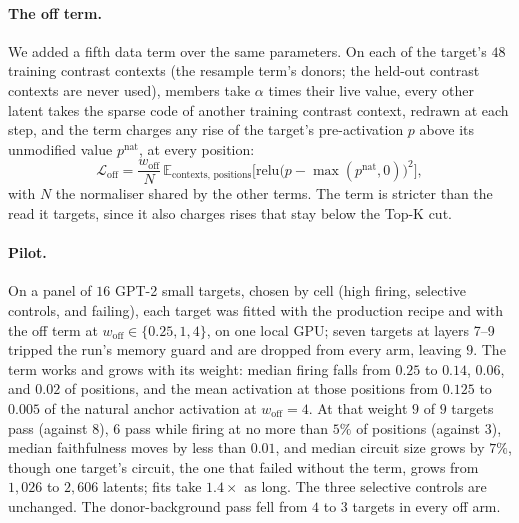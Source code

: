 \documentclass[10pt]{article}
\begin{document}
\paragraph{The off term.}
We added a fifth data term over the same parameters.
On each of the target's $48$ training contrast contexts (the resample term's donors; the held-out contrast contexts are never used), members take $\alpha$ times their live value, every other latent takes the sparse code of another training contrast context, redrawn at each step, and the term charges any rise of the target's pre-activation $p$ above its unmodified value $p^{\mathrm{nat}}$, at every position:
\[
\mathcal{L}_{\mathrm{off}} = \frac{w_{\mathrm{off}}}{N}\, \mathbb{E}_{\text{contexts, positions}} \Big[\mathrm{relu}\big(p - \max(p^{\mathrm{nat}}, 0)\big)^{2}\Big],
\]
with $N$ the normaliser shared by the other terms.
The term is stricter than the read it targets, since it also charges rises that stay below the Top-K cut.

\paragraph{Pilot.}
On a panel of $16$ GPT-2 small targets, chosen by cell (high firing, selective controls, and failing), each target was fitted with the production recipe and with the off term at $w_{\mathrm{off}} \in \{0.25, 1, 4\}$, on one local GPU; seven targets at layers 7--9 tripped the run's memory guard and are dropped from every arm, leaving $9$.
The term works and grows with its weight: median firing falls from $0.25$ to $0.14$, $0.06$, and $0.02$ of positions, and the mean activation at those positions from $0.125$ to $0.005$ of the natural anchor activation at $w_{\mathrm{off}} = 4$.
At that weight $9$ of $9$ targets pass (against $8$), $6$ pass while firing at no more than $5\%$ of positions (against $3$), median faithfulness moves by less than $0.01$, and median circuit size grows by $7\%$, though one target's circuit, the one that failed without the term, grows from $1{,}026$ to $2{,}606$ latents; fits take $1.4\times$ as long.
The three selective controls are unchanged.
The donor-background pass fell from $4$ to $3$ targets in every off arm.
\end{document}
